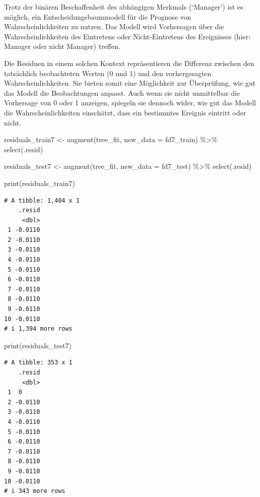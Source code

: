\documentclass[
  letterpaper,
  DIV=11,
  numbers=noendperiod]{scrartcl}
\newenvironment{Shaded}{\begin{snugshade}}{\end{snugshade}}
\newcommand{\AttributeTok}[1]{\textcolor[rgb]{0.40,0.45,0.13}{#1}}
\newcommand{\FunctionTok}[1]{\textcolor[rgb]{0.28,0.35,0.67}{#1}}
\newcommand{\NormalTok}[1]{\textcolor[rgb]{0.00,0.23,0.31}{#1}}
\newcommand{\OtherTok}[1]{\textcolor[rgb]{0.00,0.23,0.31}{#1}}
\newcommand{\SpecialCharTok}[1]{\textcolor[rgb]{0.37,0.37,0.37}{#1}}
\begin{document}
Trotz der binären Beschaffenheit des abhängigen Merkmals (`Manager') ist
es möglich, ein Entscheidungsbaummodell für die Prognose von
Wahrscheinlichkeiten zu nutzen. Das Modell wird Vorhersagen über die
Wahrscheinlichkeiten des Eintretens oder Nicht-Eintretens des
Ereignisses (hier: Manager oder nicht Manager) treffen.

Die Residuen in einem solchen Kontext repräsentieren die Differenz
zwischen den tatsächlich beobachteten Werten (0 und 1) und den
vorhergesagten Wahrscheinlichkeiten. Sie bieten somit eine Möglichkeit
zur Überprüfung, wie gut das Modell die Beobachtungen anpasst. Auch wenn
sie nicht unmittelbar die Vorhersage von 0 oder 1 anzeigen, spiegeln sie
dennoch wider, wie gut das Modell die Wahrscheinlichkeiten einschätzt,
dass ein bestimmtes Ereignis eintritt oder nicht.

\begin{Shaded}
\begin{Highlighting}[]
\NormalTok{residuals\_train7 }\OtherTok{\textless{}{-}} \FunctionTok{augment}\NormalTok{(tree\_fit, }\AttributeTok{new\_data =}\NormalTok{ fd7\_train) }\SpecialCharTok{\%\textgreater{}\%} \FunctionTok{select}\NormalTok{(.resid)}

\NormalTok{residuals\_test7 }\OtherTok{\textless{}{-}} \FunctionTok{augment}\NormalTok{(tree\_fit, }\AttributeTok{new\_data =}\NormalTok{ fd7\_test) }\SpecialCharTok{\%\textgreater{}\%} \FunctionTok{select}\NormalTok{(.resid)}

\FunctionTok{print}\NormalTok{(residuals\_train7)}
\end{Highlighting}
\end{Shaded}

\begin{verbatim}
# A tibble: 1,404 x 1
    .resid
     <dbl>
 1 -0.0110
 2 -0.0110
 3 -0.0110
 4 -0.0110
 5 -0.0110
 6 -0.0110
 7 -0.0110
 8 -0.0110
 9 -0.0110
10 -0.0110
# i 1,394 more rows
\end{verbatim}

\begin{Shaded}
\begin{Highlighting}[]
\FunctionTok{print}\NormalTok{(residuals\_test7)}
\end{Highlighting}
\end{Shaded}

\begin{verbatim}
# A tibble: 353 x 1
    .resid
     <dbl>
 1  0     
 2 -0.0110
 3 -0.0110
 4 -0.0110
 5 -0.0110
 6 -0.0110
 7 -0.0110
 8 -0.0110
 9 -0.0110
10 -0.0110
# i 343 more rows
\end{verbatim}
\end{document}
